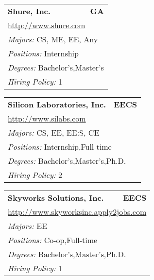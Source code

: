 \documentclass[twoside]{article}
\begin{document}
\begin{center}
\begin{multicols}{3}
\begin{FlushLeft}
\begin{minipage}{.9\columnwidth}
\end{minipage}
 
\begin{minipage}{.9\columnwidth}\begin{tabularx}{.95\columnwidth}{Xr}
                 {\Large\bf Shure, Inc.} & {\Large\bf GA}\\
    \multicolumn{2}{p{.95\columnwidth}}{\url{http://www.shure.com}}\\
    \multicolumn{2}{p{.95\columnwidth}}{\emph{Majors:} CS, ME, EE, Any}\\
    \multicolumn{2}{p{.95\columnwidth}}{\emph{Positions:} Internship}\\
    \multicolumn{2}{p{.95\columnwidth}}{\emph{Degrees:} Bachelor's,Master's}\\
    \multicolumn{2}{p{.95\columnwidth}}{\emph{Hiring Policy:} 1}\\
    \end{tabularx}
    
\end{minipage}
 
\begin{minipage}{.9\columnwidth}\begin{tabularx}{.95\columnwidth}{Xr}
                 {\Large\bf Silicon Laboratories, Inc.} & {\Large\bf EECS}\\
    \multicolumn{2}{p{.95\columnwidth}}{\url{http://www.silabs.com}}\\
    \multicolumn{2}{p{.95\columnwidth}}{\emph{Majors:} CS, EE, EE:S, CE}\\
    \multicolumn{2}{p{.95\columnwidth}}{\emph{Positions:} Internship,Full-time}\\
    \multicolumn{2}{p{.95\columnwidth}}{\emph{Degrees:} Bachelor's,Master's,Ph.D.}\\
    \multicolumn{2}{p{.95\columnwidth}}{\emph{Hiring Policy:} 2}\\
    \end{tabularx}
    
\end{minipage}
 
\begin{minipage}{.9\columnwidth}\begin{tabularx}{.95\columnwidth}{Xr}
                 {\Large\bf Skyworks Solutions, Inc.} & {\Large\bf EECS}\\
    \multicolumn{2}{p{.95\columnwidth}}{\url{http://www.skyworksinc.apply2jobs.com}}\\
    \multicolumn{2}{p{.95\columnwidth}}{\emph{Majors:} EE}\\
    \multicolumn{2}{p{.95\columnwidth}}{\emph{Positions:} Co-op,Full-time}\\
    \multicolumn{2}{p{.95\columnwidth}}{\emph{Degrees:} Bachelor's,Master's,Ph.D.}\\
    \multicolumn{2}{p{.95\columnwidth}}{\emph{Hiring Policy:} 1}\\
    \end{tabularx}
    

\end{minipage}
\end{FlushLeft}
\end{multicols}
\end{center}
\end{document}

